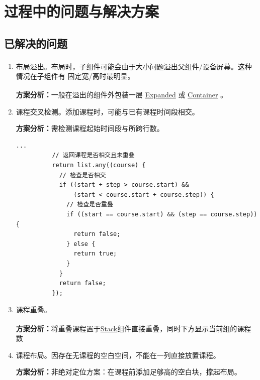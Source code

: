 \documentclass[12pt]{article}
\begin{document}
\section{过程中的问题与解决方案}

  \subsection{已解决的问题}

    \begin{enumerate}
      \item 布局溢出\textsuperscript{\cite{ref:overflow}}。布局时，子组件可能会由于大小问题溢出父组件/设备屏幕。这种情况在子组件有
      固定宽/高时最明显。

        \textbf{方案分析：}一般在溢出的组件外包装一层 \uline{Expanded}\textsuperscript{\cite{ref:Expanded}} 或 \uline{Container}\textsuperscript{\cite{ref:Container}} 。

      \item 课程交叉检测。添加课程时，可能与已有课程时间段相交。

        \textbf{方案分析：}需检测课程起始时间段与所跨行数。

        \begin{lstlisting}[frame=shadowbox]
          ...
          // 返回课程是否相交且未重叠
          return list.any((course) {
            // 检查是否相交
            if ((start + step > course.start) &&
                (start < course.start + course.step)) {
              // 检查是否重叠
              if ((start == course.start) && (step == course.step)) {
                return false;
              } else {
                return true;
              }
            }
            return false;
          });
        \end{lstlisting}

      \item 课程重叠。

        \textbf{方案分析：}将重叠课程置于\uline{Stack}\textsuperscript{\cite{ref:Stack}}组件直接重叠，同时下方显示当前组的课程数

      \item 课程布局。因存在无课程的空白空间，不能在一列直接放置课程。

        \textbf{方案分析：}非绝对定位方案：在课程前添加足够高的空白块，撑起布局。


\end{enumerate}
\end{document}
